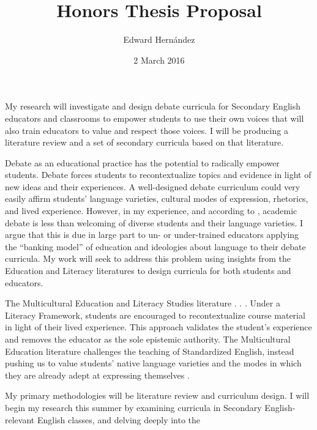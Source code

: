\documentclass[man,12pt,natbib]{apa6}
\begin{document}
\title{Honors Thesis Proposal}
\author{Edward Hern\'{a}ndez}
\date{2 March 2016}
\maketitle

My research will investigate and design debate curricula for Secondary English
educators and classrooms to empower students to use their own voices that will
also train educators to value and respect those voices. I will be producing a
literature review and a set of secondary curricula based on that literature.

Debate as an educational practice has the potential to radically empower
students. Debate forces students to recontextualize topics and evidence in
light of new ideas and their experiences. A well-designed debate curriculum
could very easily affirm students' language varieties, cultural modes of
expression, rhetorics, and lived experience. However, in my experience, and
according to \citet{Polson12}, academic debate is less than welcoming of
diverse students and their language varieties. I argue that this is due in
large part to un- or under-trained educators applying the ``banking model'' of
education \citep{Friere68} and ideologies about language \citep{LippiGreen11}
to their debate curricula. My work will seek to address this problem using
insights from the Education and Literacy literatures to design curricula for
both students and educators.

The Multicultural Education \citep{} and Literacy Studies \citep{} literature .
. . Under a Literacy Framework, students are encouraged to recontextualize
course material in light of their lived experience. This approach validates the
student's experience and removes the educator as the sole epistemic authority.
The Multicultural Education literature challenges the teaching of Standardized
English, instead pushing us to value students' native language varieties and
the modes in which they are already adept at expressing themselves
\citep{NCTE}.

My primary methodologies will be literature review and curriculum design. I
will begin my research this summer by examining curricula in Secondary
English-relevant English classes, and delving deeply into the 

\clearpage

\end{document}
